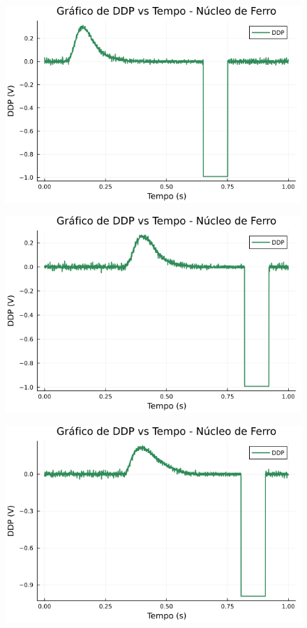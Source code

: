 \begin{center}
\begin{multicols}{2}
\begin{figure}[H]
    \centering
    \includegraphics[width=1.0\linewidth]{figuras/grafico_dados3_F0003CH1.png}
\end{figure}

\begin{figure}[H]
    \centering
    \includegraphics[width=1.0\linewidth]{figuras/grafico_dados3_F0004CH1.png}
\end{figure}

\begin{figure}[H]
    \centering
    \includegraphics[width=1.0\linewidth]{figuras/grafico_dados3_F0005CH1.png}
\end{figure}


\end{multicols}
\end{center}
